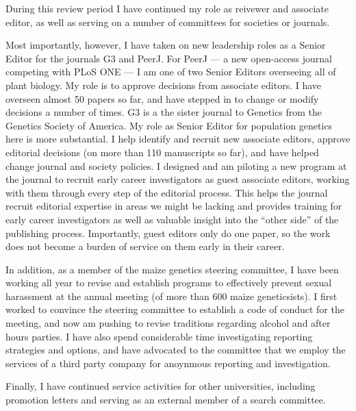 \documentclass[letterpaper,10pt]{article}
\begin{document}
During this review period I have continued my role as reivewer and associate editor, as well as serving on a number of committees for societies or journals.

Most importantly, however, I have taken on new leadership roles as a Senior Editor for the journals G3 and PeerJ.
For PeerJ --- a new open-access journal competing with PLoS ONE --- I am one of two Senior Editors overseeing all of plant biology.
My role is to approve decisions from associate editors.  I have overseen almost 50 papers so far, and have stepped in to change or modify decisions a number of times.
G3 is a the sister journal to Genetics from the Genetics Society of America. My role as Senior Editor for population genetics here is more substantial. I help identify and recruit new associate editors, approve editorial decisions (on more than 110 manuscripts so far), and have helped change journal and society policies. I designed and am piloting a new program at the journal to recruit early career investigators as guest associate editors, working with them through every step of the editorial process. This helps the journal recruit editorial expertise in areas we might be lacking and provides training for early career investigators as well as valuable insight into the ``other side'' of the publishing process. Importantly, guest editors only do one paper, so the work does not become a burden of service on them early in their career.

In addition, as a member of the maize genetics steering committee, I have been working all year to revise and establish programs to effectively prevent sexual harassment at the annual meeting (of more than 600 maize geneticsists). I first worked to convince the steering committee to establish a code of conduct for the meeting, and now am pushing to revise traditions regarding alcohol and after hours parties. I have also spend considerable time investigating reporting strategies and options, and have advocated to the committee that we employ the services of a third party company for anoynmous reporting and investigation.

Finally, I have continued service activities for other universities, including promotion letters and serving as an external member of a search committee.



\end{document}
